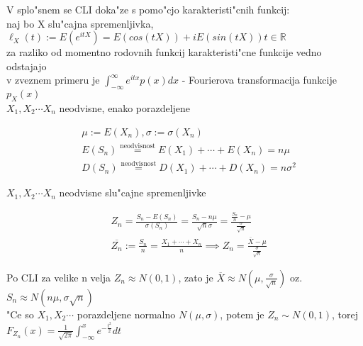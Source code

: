 \documentclass[a4paper,12pt]{article}
\theoremstyle{definition}
\theoremstyle{remark}
\newcommand{\R}{\mathbb{R}}
\begin{document}
V splo"snem se CLI doka"ze s pomo"cjo karakteristi"cnih funkcij: \\
naj bo X slu"cajna spremenljivka, $\ell_X(t) := E(e^{itX}) = E(cos(tX)) + iE(sin(tX)) t \in \R$ \\
za razliko od momentno rodovnih funkcij karakteristi"cne funkcije vedno odstajajo \\
v zveznem primeru je $\int_{-\infty}^{\infty} e^{itx}p(x)dx$ - Fourierova transformacija funkcije $p_X(x)$ \\
$X_1, X_2 \cdots X_n$ neodvisne, enako porazdeljene

\begin{align*}
    &\mu := E(X_n), \sigma := \sigma(X_n) \\
    &E(S_n) \stackrel{\text{neodvisnost}}{=} E(X_1) + \cdots + E(X_n) = n \mu \\
    &D(S_n) \stackrel{\text{neodvisnost}}{=} D(X_1) + \cdots + D(X_n) = n \sigma^2
\end{align*}

$X_1, X_2 \cdots X_n$ neodvisne slu"cajne spremenljivke

\begin{align*}
    &Z_n = \frac{S_n - E(S_n)}{\sigma(S_n)} = \frac{S_n - n \mu}{\sqrt{n} \sigma} =
        \frac{\frac{S_n}{n} - \mu}{\frac{\sigma}{\sqrt{n}}} \\
    &\overline{Z_n} := \frac{S_n}{n} = \frac{X_1 + \cdots + X_n}{n} \implies
        Z_n = \frac{\overline{X} - \mu}{\frac{\sigma}{\sqrt{n}}}
\end{align*}

Po CLI za velike n velja $Z_n \approx N(0,1)$, zato je $\overline{X} \approx N(\mu, \frac{\sigma}{\sqrt{n}})$ oz.
$S_n \approx N(n \mu, \sigma \sqrt{n})$ \\
"Ce so $X_1, X_2 \cdots$ porazdeljene normalno $N(\mu, \sigma)$, potem je $Z_n \sim N(0,1)$, torej
$F_{Z_n}(x) = \frac{1}{\sqrt{2\pi}} \int_{-\infty}^{x} e^{-\frac{t^2}{2}} dt$ \\
\end{document}
